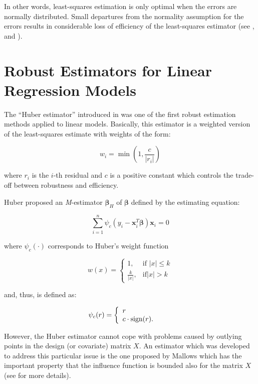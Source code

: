 \documentclass[]{book}
\theoremstyle{definition}
\theoremstyle{definition}
\theoremstyle{definition}
\theoremstyle{remark}
\begin{document}
{In other words, least-squares estimation is only optimal when the errors
are normally distributed. Small departures from the normality assumption
for the errors results in considerable loss of efficiency of the
least-squares estimator (see \citet{hampel1987robust},
\citet{huber1973robust} and \citet{hampel1973robust}).

\hypertarget{robust-estimators-for-linear-regression-models}{%
\section{Robust Estimators for Linear Regression
Models}\label{robust-estimators-for-linear-regression-models}}

The ``Huber estimator'' introduced in \citet{huber1973robust} was one of
the first robust estimation methods applied to linear models. Basically,
this estimator is a weighted version of the least-squares estimate with
weights of the form:

\[
w_{i} = \min \left(1,\frac{c}{|r_{i}|}\right)
\]

where \(r_{i}\) is the \(i\)-th residual and \(c\) is a positive
constant which controls the trade-off between robustness and efficiency.

Huber proposed an \textit{M}-estimator \(\hat{\boldsymbol{\beta}}_{H}\)
of \(\boldsymbol{\beta}\) defined by the estimating equation:

\[
    \sum_{i = 1}^{n} \psi_{c}\left(y_{i} - \mathbf{x}_{i}^{T} \boldsymbol{\beta} \right)\mathbf{x}_{i} = 0
\]

where \(\psi_{c}(\cdot)\) corresponds to Huber's weight function

\begin{equation}
w\left({x}\right) = \begin{cases}
1, &\text{if } \left|{x}\right| \le k \\
\frac{k}{\left|{x}\right|}, &\text{if} \left|{x}\right| > k
\end{cases}
\label{eq:huberweight}
\end{equation}

and, thus, is defined as:

\[
\psi_{c}(r) = \left\{  
\begin{array}{l l}
  r & \quad \\
  c \cdot \text{sign}(r). & \quad \\
\end{array} \right. 
\]

However, the Huber estimator cannot cope with problems caused by
outlying points in the design (or covariate) matrix \(X\). An estimator
which was developed to address this particular issue is the one proposed
by Mallows which has the important property that the influence function
is bounded also for the matrix \(X\) (see \citet{krasker1980estimation}
for more details).

}
\end{document}
